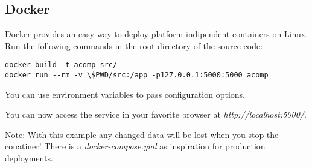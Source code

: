 \subsection{Docker}
\label{gXLII:sec:usage:docker}  %
Docker provides an easy way to deploy platform indipendent containers on Linux.
Run the following commands in the root directory of the source code:

\begin{lstlisting}
docker build -t acomp src/
docker run --rm -v \$PWD/src:/app -p127.0.0.1:5000:5000 acomp
\end{lstlisting}

You can use environment variables to pass configuration options.

You can now access the service in your favorite browser at
\textit{http://localhost:5000/}.

Note: With this example any changed data will be lost when you stop the
conatiner! There is a \textit{docker-compose.yml} as inspiration for production deployments.
